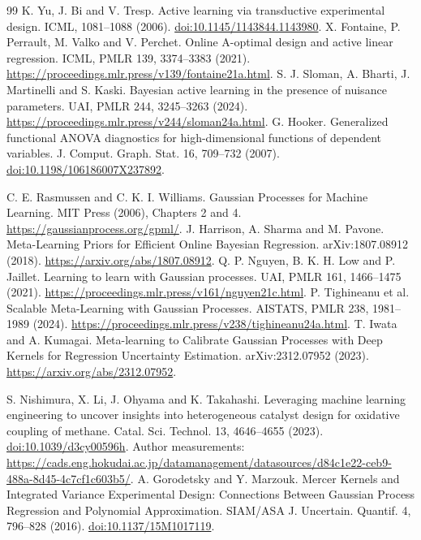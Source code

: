 \begin{thebibliography}{99}
 K. Yu, J. Bi and V. Tresp. Active learning via transductive experimental design. ICML, 1081--1088 (2006). \href{https://doi.org/10.1145/1143844.1143980}{doi:10.1145/1143844.1143980}.
 X. Fontaine, P. Perrault, M. Valko and V. Perchet. Online A-optimal design and active linear regression. ICML, PMLR 139, 3374--3383 (2021). \url{https://proceedings.mlr.press/v139/fontaine21a.html}.
 S. J. Sloman, A. Bharti, J. Martinelli and S. Kaski. Bayesian active learning in the presence of nuisance parameters. UAI, PMLR 244, 3245--3263 (2024). \url{https://proceedings.mlr.press/v244/sloman24a.html}.
 G. Hooker. Generalized functional ANOVA diagnostics for high-dimensional functions of dependent variables. J. Comput. Graph. Stat. 16, 709--732 (2007). \href{https://doi.org/10.1198/106186007X237892}{doi:10.1198/106186007X237892}.


 C. E. Rasmussen and C. K. I. Williams. Gaussian Processes for Machine Learning. MIT Press (2006), Chapters 2 and 4. \url{https://gaussianprocess.org/gpml/}.
 J. Harrison, A. Sharma and M. Pavone. Meta-Learning Priors for Efficient Online Bayesian Regression. arXiv:1807.08912 (2018). \url{https://arxiv.org/abs/1807.08912}.
 Q. P. Nguyen, B. K. H. Low and P. Jaillet. Learning to learn with Gaussian processes. UAI, PMLR 161, 1466--1475 (2021). \url{https://proceedings.mlr.press/v161/nguyen21c.html}.
 P. Tighineanu et al. Scalable Meta-Learning with Gaussian Processes. AISTATS, PMLR 238, 1981--1989 (2024). \url{https://proceedings.mlr.press/v238/tighineanu24a.html}.
 T. Iwata and A. Kumagai. Meta-learning to Calibrate Gaussian Processes with Deep Kernels for Regression Uncertainty Estimation. arXiv:2312.07952 (2023). \url{https://arxiv.org/abs/2312.07952}.


 S. Nishimura, X. Li, J. Ohyama and K. Takahashi. Leveraging machine learning engineering to uncover insights into heterogeneous catalyst design for oxidative coupling of methane. Catal. Sci. Technol. 13, 4646--4655 (2023). \href{https://doi.org/10.1039/d3cy00596h}{doi:10.1039/d3cy00596h}. Author measurements: \url{https://cads.eng.hokudai.ac.jp/datamanagement/datasources/d84c1e22-ceb9-488a-8d45-4c7cf1c603b5/}.
 A. Gorodetsky and Y. Marzouk. Mercer Kernels and Integrated Variance Experimental Design: Connections Between Gaussian Process Regression and Polynomial Approximation. SIAM/ASA J. Uncertain. Quantif. 4, 796--828 (2016). \href{https://doi.org/10.1137/15M1017119}{doi:10.1137/15M1017119}.



\end{thebibliography}
